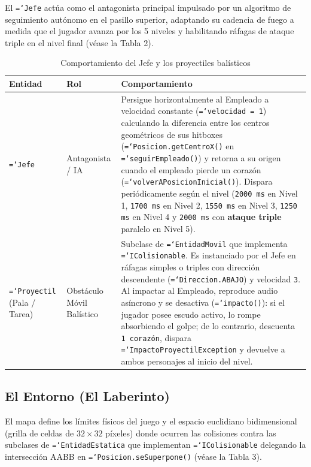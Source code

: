 \documentclass[12pt, a4paper]{article}
\DeclareRobustCommand{\code}[1]{\textcolor{codegreen}{\texttt{\hyphenchar\font=`\-#1}}}
\begin{document}
El \code{Jefe} actúa como el antagonista principal impulsado por un algoritmo de seguimiento autónomo en el pasillo superior, adaptando su cadencia de fuego a medida que el jugador avanza por los 5 niveles y habilitando ráfagas de ataque triple en el nivel final (véase la Tabla 2).

\begin{table}[H]
\caption{Comportamiento del Jefe y los proyectiles balísticos}
\begin{tabularx}{\textwidth}{@{} >{\raggedright\arraybackslash}p{2.9cm} >{\raggedright\arraybackslash}p{3.5cm} >{\raggedright\arraybackslash}X @{}}
\toprule
\textbf{Entidad} & \textbf{Rol} & \textbf{Comportamiento} \\
\midrule
\code{Jefe} & Antagonista / IA & Persigue horizontalmente al Empleado a velocidad constante (\code{velocidad = 1}) calculando la diferencia entre los centros geométricos de sus hitboxes (\code{Posicion.getCentroX()} en \code{seguirEmpleado()}) y retorna a su origen cuando el empleado pierde un corazón (\code{volverAPosicionInicial()}). Dispara periódicamente según el nivel (\texttt{2000 ms} en Nivel 1, \texttt{1700 ms} en Nivel 2, \texttt{1550 ms} en Nivel 3, \texttt{1250 ms} en Nivel 4 y \texttt{2000 ms} con \textbf{ataque triple} paralelo en Nivel 5). \\
\addlinespace[6pt]
\code{Proyectil} (Pala / Tarea) & Obstáculo Móvil Balístico & Subclase de \code{EntidadMovil} que implementa \code{IColisionable}. Es instanciado por el Jefe en ráfagas simples o triples con dirección descendente (\code{Direccion.ABAJO}) y velocidad \texttt{3}. Al impactar al Empleado, reproduce audio asíncrono y se desactiva (\code{impacto()}): si el jugador posee escudo activo, lo rompe absorbiendo el golpe; de lo contrario, descuenta \texttt{1 corazón}, dispara \code{ImpactoProyectilException} y devuelve a ambos personajes al inicio del nivel. \\
\bottomrule
\end{tabularx}
\end{table}

\subsection{El Entorno (El Laberinto)}

El mapa define los límites físicos del juego y el espacio euclidiano bidimensional (grilla de celdas de $32 \times 32$ píxeles) donde ocurren las colisiones contra las subclases de \code{EntidadEstatica} que implementan \code{IColisionable} delegando la intersección AABB en \code{Posicion.seSuperpone()} (véase la Tabla 3).
\end{document}
